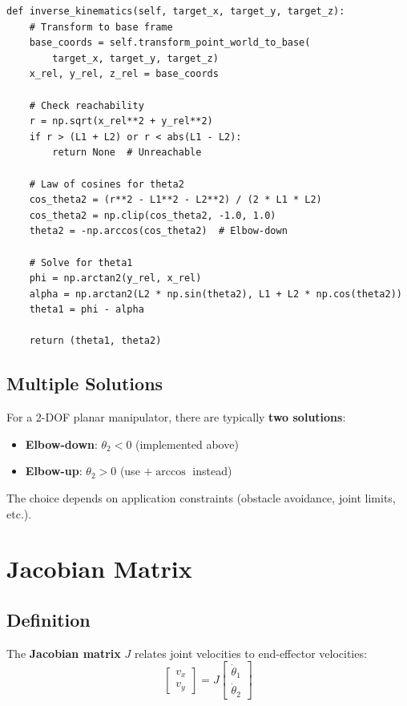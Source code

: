 \documentclass[11pt,a4paper]{article}
\begin{document}
\begin{lstlisting}
def inverse_kinematics(self, target_x, target_y, target_z):
    # Transform to base frame
    base_coords = self.transform_point_world_to_base(
        target_x, target_y, target_z)
    x_rel, y_rel, z_rel = base_coords
    
    # Check reachability
    r = np.sqrt(x_rel**2 + y_rel**2)
    if r > (L1 + L2) or r < abs(L1 - L2):
        return None  # Unreachable
    
    # Law of cosines for theta2
    cos_theta2 = (r**2 - L1**2 - L2**2) / (2 * L1 * L2)
    cos_theta2 = np.clip(cos_theta2, -1.0, 1.0)
    theta2 = -np.arccos(cos_theta2)  # Elbow-down
    
    # Solve for theta1
    phi = np.arctan2(y_rel, x_rel)
    alpha = np.arctan2(L2 * np.sin(theta2), L1 + L2 * np.cos(theta2))
    theta1 = phi - alpha
    
    return (theta1, theta2)
\end{lstlisting}

\subsection{Multiple Solutions}

For a 2-DOF planar manipulator, there are typically \textbf{two solutions}:
\begin{itemize}
    \item \textbf{Elbow-down}: $\theta_2 < 0$ (implemented above)
    \item \textbf{Elbow-up}: $\theta_2 > 0$ (use $+\arccos$ instead)
\end{itemize}

The choice depends on application constraints (obstacle avoidance, joint limits, etc.).

\section{Jacobian Matrix}

\subsection{Definition}

The \textbf{Jacobian matrix} $J$ relates joint velocities to end-effector velocities:
\begin{equation}
\begin{bmatrix} v_x \\ v_y \end{bmatrix} = J \begin{bmatrix} \dot{\theta}_1 \\ \dot{\theta}_2 \end{bmatrix}
\end{equation}
\end{document}
